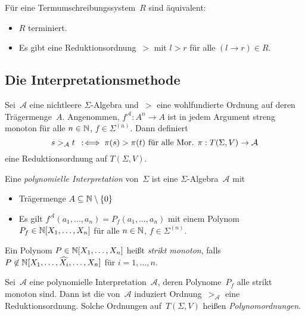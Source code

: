 \documentclass{cheat-sheet}
\renewcommand{\Alg}{\mathcal{A}} %
\begin{document}
\begin{samepage}

\begin{thm}
  Für eine Termumschreibungssystem~$R$ sind äquivalent:
  \begin{itemize}
    \item $R$ terminiert.
    \item Es gibt eine Reduktionsordnung~$>$ mit $l > r$ für alle $(l \to r) \in R$.
  \end{itemize}
\end{thm}

\subsection{Die Interpretationsmethode}
  
\end{samepage}

\begin{lemdefn}
  Sei~$\Alg$ eine nichtleere $\Sigma$-Algebra und~$>$ eine wohlfundierte Ordnung auf deren Trägermenge~$A$.
  Angenommen, $f^\Alg : A^n \to A$ ist in jedem Argument streng monoton für alle $n \in \mathbb{N}$, $f \in \Sigma^{(n)}$.
  Dann definiert
  \[
    s >_\Alg t \coloniff \pi(s) > \pi(t) \text{ für alle Mor. $\pi : T(\Sigma, V) \to \Alg$}
  \]
  eine Reduktionsordnung auf $T(\Sigma, V)$.
\end{lemdefn}


\begin{defn}
  Eine \emph{polynomielle Interpretation} von~$\Sigma$ ist eine $\Sigma$-Algebra~$\Alg$ mit
  \begin{itemize}
    \item Trägermenge $A \subseteq \mathbb{N} \setminus \{ 0 \}$
    \item Es gilt $f^\Alg(a_1, \ldots, a_n) = P_f(a_1, \ldots, a_n)$ mit einem Polynom $P_f \in \mathbb{N}[X_1, \ldots, X_n]$ für alle $n \in \mathbb{N}$, $f \in \Sigma^{(n)}$.
  \end{itemize}
\end{defn}

\begin{defn}
  Ein Polynom $P \in \mathbb{N}[X_1, \ldots, X_n]$ heißt \emph{strikt monoton}, falls $P \not\in \mathbb{N}[X_1, \ldots, \widehat{X_i}, \ldots, X_n]$ für $i = 1, \ldots, n$.
\end{defn}

\begin{lemdefn}
  Sei~$\Alg$ eine polynomielle Interpretation~$\Alg$, deren Polynome~$P_f$ alle strikt monoton sind.
  Dann ist die von~$\Alg$ induziert Ordnung~$>_\Alg$ eine Reduktionsordnung.
  Solche Ordnungen auf~$T(\Sigma, V)$ heißen \emph{Polynomordnungen}.
\end{lemdefn}
\end{document}
